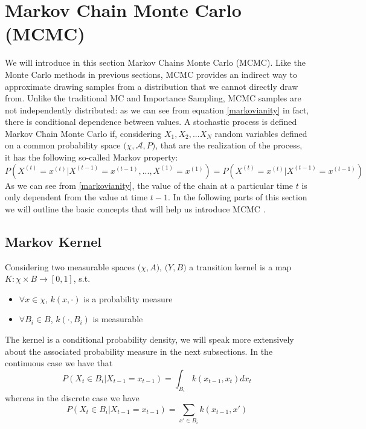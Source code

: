 \documentclass[12pt,mythesisstyle]{report}
\begin{document}
\section{Markov Chain Monte Carlo (MCMC)}\label{section: mcmc}
We will introduce in this section Markov Chains Monte Carlo (MCMC). Like the Monte Carlo methods in previous sections, MCMC provides an indirect way to approximate drawing samples from a distribution that we cannot directly draw from. Unlike the traditional MC and Importance Sampling, MCMC samples are not independently distributed: as we can see from equation \eqref{markovianity} in fact, there is conditional dependence between values. A stochastic process is defined Markov Chain Monte Carlo if, considering $X_1, X_2, ...X_N$ random variables defined on a common probability space $\big(\chi, \mathcal{A}, P\big)$, that are the realization of the process, it has the following so-called Markov property:
\begin{equation}\label{markovianity}
P(X^{(t)}=x^{(t)}|X^{(t-1)}=x^{(t-1)},...,X^{(1)}=x^{(1)})=P(X^{(t)}=x^{(t)}|X^{(t-1)}=x^{(t-1)})
\end{equation}
As we can see from  \eqref{markovianity}, the value of the chain at a particular time $t$ is only dependent from the value at time $t-1$. In the following parts of this section we will outline the basic concepts that will help us introduce MCMC \cite{RobertCasella}.

\subsection{Markov Kernel}\label{section:Markovkernels}
Considering two measurable spaces $\big(\chi, A\big)$, $\big(Y, B\big)$ a transition kernel is a map \cite{RobertCasella}  $K:\chi \times B\rightarrow [0,1]$, s.t.

\begin{itemize}\label{MArkovKernel}
	\item $\forall x \in \chi$, $k(x,\cdot)$ is a probability measure
	\item $\forall B_i \in B$, $k(\cdot, B_i)$ is measurable
\end{itemize}
The kernel is a conditional probability density, we will speak more extensively about the associated probability measure in the next subsections. In the continuous case we have that
\begin{equation}\label{MarkovKernelContinuous}
P(X_t \in B_i|X_{t-1}=x_{t-1})=\int_{B_i}k(x_{t-1},x_t)dx_t
\end{equation}
whereas in the discrete case we have
\begin{equation}\label{MarkovKernelDiscrete}
P(X_t \in B_i|X_{t-1}=x_{t-1}) = \sum_{x'\in B_i} k(x_{t-1},x')
\end{equation}
\end{document}
